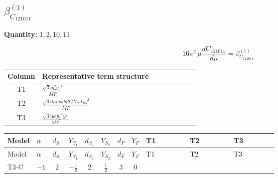 \documentclass[8pt]{article}
\begin{document}
\begin{landscape}
\section*{$\beta_{C_{121011}}^{(1)}$}
\noindent\textbf{Quantity: }$\mathrm{1,2,10,11}$\par\smallskip
\[16\pi^2\,\mu\frac{d C_{121011}}{d\mu}=\beta_{C_{121011}}^{(1)}\]
\begin{center}
\begin{tabular}{@{}c >{\raggedright\arraybackslash}p{0.82\linewidth}@{}}
\toprule
Column & Representative term structure \\
\midrule
T1 & \(\displaystyle \frac{\sqrt{3} i g_{2}^{2} \overline{y_{2}}^{2}}{MF}\) \\
\midrule
T2 & \(\displaystyle \frac{\sqrt{3} i lambdaS2Inv1 \overline{y_{2}}^{2}}{MF}\) \\
\midrule
T3 & \(\displaystyle \frac{\sqrt{3} i ye \overline{y_{2}}^{2} \overline{ye}}{MF}\) \\
\midrule
\bottomrule
\end{tabular}
\end{center}
\smallskip
\tiny
\begin{longtable}{@{}llcccccc >{\raggedright\arraybackslash}p{0.21\linewidth} >{\raggedright\arraybackslash}p{0.21\linewidth} >{\raggedright\arraybackslash}p{0.21\linewidth}@{}}
\toprule
Model & $\alpha$ & $d_{S_1}$ & $Y_{S_1}$ & $d_{S_2}$ & $Y_{S_2}$ & $d_F$ & $Y_F$ & T1 & T2 & T3 \\
\midrule
\endfirsthead
\toprule
Model & $\alpha$ & $d_{S_1}$ & $Y_{S_1}$ & $d_{S_2}$ & $Y_{S_2}$ & $d_F$ & $Y_F$ & T1 & T2 & T3 \\
\midrule
\endhead
T3-C & $-1$ & $2$ & $-\frac{1}{2}$ & $2$ & $\frac{1}{2}$ & $3$ & $0$ & \scriptsize\adjustbox{max width=\linewidth}{$\begin{gathered} \frac{\sqrt{3} i g_{2}^{2} \overline{y_{2}}^{2}}{8 MF}\end{gathered}$} & \scriptsize\adjustbox{max width=\linewidth}{$\begin{gathered} \frac{\sqrt{3} i lambdaS2Inv1 \overline{y_{2}}^{2}}{12 MF}\end{gathered}$} & \scriptsize\adjustbox{max width=\linewidth}{$\begin{gathered} - \frac{\sqrt{3} i ye \overline{y_{2}}^{2} \overline{ye}}{24 MF}\end{gathered}$} \\
\midrule
\bottomrule
\end{longtable}
\clearpage

\end{landscape}
\end{document}
